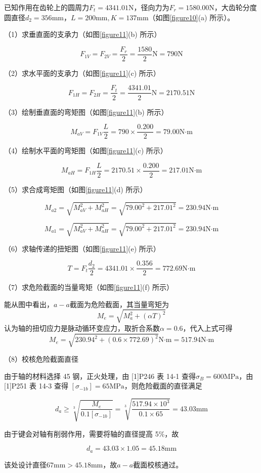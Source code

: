 \documentclass[12pt]{ctexart}
\begin{document}
已知作用在齿轮上的圆周力$F_t=4341.01\text{N}$，径向力为$F_r=1580.00\text{N}$，大齿轮分度圆直径$d_2=356\text{mm}$，$L=200\text{mm}, K=137\text{mm}$（如图\ref{figure10}(a) 所示）。


（1）求垂直面的支承力（如图\ref{figure11}(b) 所示）

$$F_{1V}=F_{2V}=\frac{F_r}{2}=\frac{1580}{2}\text{N}=790\text{N}$$

（2）求水平面的支承力（如图\ref{figure11}(c) 所示）

$$F_{1H}=F_{2H}=\frac{F_t}{2}=\frac{4341.01}{2}\text{N}=2170.51\text{N}$$

（3）绘制垂直面的弯矩图（如图\ref{figure11}(b) 所示）

$$M_{aV}=F_{1V}\frac{L}{2}=790\times \frac{0.200}{2}=79.00\text{N·m}$$

（4）绘制水平面的弯矩图（如图\ref{figure11}(c) 所示）

$$M_{aH}=F_{1H}\frac{L}{2}=2170.51\times \frac{0.200}{2}=217.01\text{N·m}$$

（5）求合成弯矩图（如图\ref{figure11}(d) 所示）

$$M_{a2}=\sqrt{M_{aV}^2+M_{aH}^2}=\sqrt{79.00^2+217.01^2}=230.94\text{N·m}$$

$$M_{a1}=\sqrt{M_{aV}^2+M_{aH}^2}=\sqrt{79.00^2+217.01^2}=230.94\text{N·m}$$

（6）求轴传递的扭矩图（如图\ref{figure11}(e) 所示）

$$T = F_t\frac{d_2}{2}=4341.01\times \frac{0.356}{2}=772.69\text{N·m}$$

（7）求危险截面的当量弯矩（如图\ref{figure11}(f) 所示）

能从图中看出，$a-a$截面为危险截面，其当量弯矩为
$$M_e=\sqrt{M_{a}^2+(\alpha T)^2}$$
认为轴的扭切应力是脉动循环变应力，取折合系数$\alpha =0.6$，代入上式可得
$$M_e=\sqrt{230.94^2+(0.6\times 772.69)^2}\text{N·m}=517.94\text{N·m}$$

（8）校核危险截面直径

由于轴的材料选择 45 钢，正火处理，由 [1]P246 表 14-1 查得$\sigma_B=600\text{MPa}$，由 [1]P251 表 14-3 查得 $[\sigma_{-1b}]=65\text{MPa}$，则危险截面的直径满足

$$d_a\ge \sqrt[3]{\frac{M_e}{0.1[\sigma_{-1b}]}}=\sqrt[3]{\frac{517.94\times 10^3}{0.1\times 65}}=43.03\text{mm}$$

由于键会对轴有削弱作用，需要将轴的直径提高 5\%，故

$$d_a=43.03\times 1.05=45.18\text{mm}$$

该处设计直径$67\text{mm}> 45.18\text{mm}$，故$a-a$截面校核通过。
\end{document}
